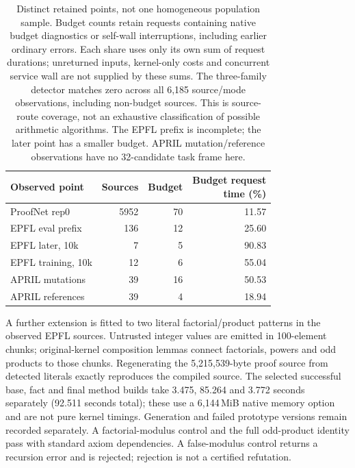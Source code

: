 \documentclass[10pt,twocolumn]{article}
\begin{document}
\begin{table}[t]
\centering
\small
\setlength{\tabcolsep}{3pt}
\begin{tabular}{lrrr}
\toprule
Observed point & Sources & Budget &
\shortstack{Budget request\\time (\%)} \\
\midrule
ProofNet rep0 & 5952 & 70 & 11.57 \\
EPFL eval prefix & 136 & 12 & 25.60 \\
EPFL later, 10k & 7 & 5 & 90.83 \\
EPFL training, 10k & 12 & 6 & 55.04 \\
APRIL mutations & 39 & 16 & 50.53 \\
APRIL references & 39 & 4 & 18.94 \\
\bottomrule
\end{tabular}
\caption{Distinct retained points, not one homogeneous population sample.
Budget counts retain requests containing native budget diagnostics or
self-wall interruptions, including earlier ordinary errors.
Each share uses only its own sum of request durations; unreturned inputs,
kernel-only costs and concurrent service wall are not supplied by these sums.
The three-family detector matches zero across all 6,185 source/mode
observations, including non-budget sources. This is source-route coverage,
not an exhaustive classification of possible arithmetic algorithms.
The EPFL prefix is incomplete; the later point has a smaller budget.
APRIL mutation/reference observations have no 32-candidate task frame here.}
\label{tab:cross-corpus-budget-coverage}
\end{table}

A further extension is fitted to two literal factorial/product patterns in
the observed EPFL sources. Untrusted integer values are emitted in
100-element chunks; original-kernel composition lemmas connect factorials,
powers and odd products to those chunks. Regenerating the 5,215,539-byte
proof source from detected literals exactly reproduces the compiled source.
The selected successful base, fact and final method builds take
3.475, 85.264 and 3.772 seconds separately (92.511 seconds total);
these use a 6,144\,MiB native memory option and are not pure kernel timings.
Generation and failed prototype versions remain recorded separately.
A factorial-modulus control and the full odd-product identity pass with
standard axiom dependencies. A false-modulus control returns a recursion
error and is rejected; rejection is not a certified refutation.
\end{document}

